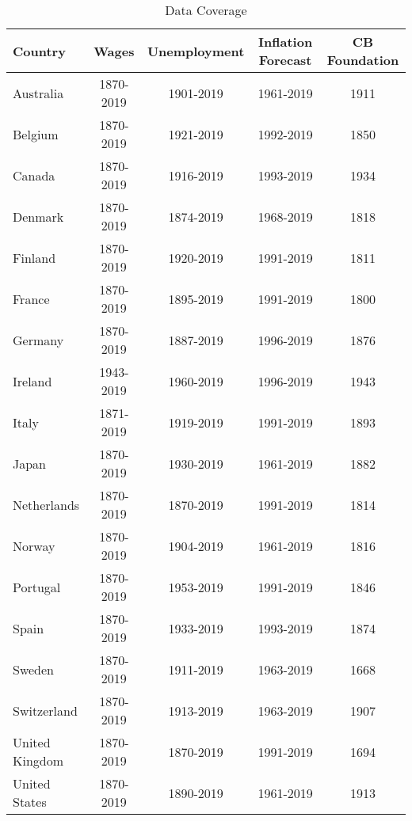 \begin{table}[ht]
\caption{Data Coverage}
\label{T_DataCoverage}
\centering
\def\sym#1{\ifmmode^{#1}\else\(^{#1}\)\fi}
\begin{tabular}{l*{4}{c}}
\hline\hline
\textbf{Country}    & \textbf{Wages}  & \textbf{Unemployment} & \textbf{Inflation Forecast} & \textbf{CB Foundation} \\
\hline
Australia       & 1870-2019 & 1901-2019 & 1961-2019 & 1911\\
Belgium         & 1870-2019 & 1921-2019 & 1992-2019 & 1850\\
Canada          & 1870-2019 & 1916-2019 & 1993-2019 & 1934\\
Denmark         & 1870-2019 & 1874-2019 & 1968-2019 & 1818\\
Finland         & 1870-2019 & 1920-2019 & 1991-2019 & 1811\\
France          & 1870-2019 & 1895-2019 & 1991-2019 & 1800\\
Germany         & 1870-2019 & 1887-2019 & 1996-2019 & 1876\\
Ireland			& 1943-2019 & 1960-2019 & 1996-2019 & 1943\\
Italy           & 1871-2019 & 1919-2019 & 1991-2019 & 1893\\
Japan           & 1870-2019 & 1930-2019 & 1961-2019 & 1882\\
Netherlands     & 1870-2019 & 1870-2019 & 1991-2019 & 1814\\
Norway          & 1870-2019 & 1904-2019 & 1961-2019 & 1816\\
Portugal        & 1870-2019 & 1953-2019 & 1991-2019 & 1846\\
Spain           & 1870-2019 & 1933-2019 & 1993-2019 & 1874\\
Sweden          & 1870-2019 & 1911-2019 & 1963-2019 & 1668\\
Switzerland     & 1870-2019 & 1913-2019 & 1963-2019 & 1907\\
United Kingdom  & 1870-2019 & 1870-2019 & 1991-2019 & 1694\\
United States   & 1870-2019 & 1890-2019 & 1961-2019 & 1913\\
\hline\hline
\end{tabular}
\end{table}